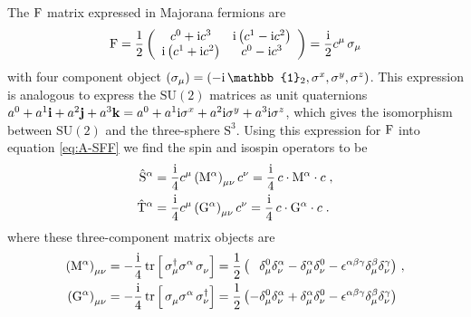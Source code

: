 The $\mathrm{F}$ matrix expressed in Majorana fermions are
\begin{equation}
    \mathrm{F} = \frac{1}{2} \left( \begin{array}{cc}
          c^0 + \mathrm{i} c^3 & \mathrm{i} \left( c^1 - \mathrm{i} c^2 \right)  \\
         \mathrm{i} \left( c^1 + \mathrm{i} c^2 \right) &  c^0 - \mathrm{i} c^3  \\
    \end{array} \right)
    = \frac{\mathrm{i} }{2}  c^\mu \,  \sigma_\mu
\end{equation}
with four component object $(\sigma_\mu)=(-\im \, \mathbb{1}_2,\sigma^x,\sigma^y,\sigma^z)$. %
This expression is analogous to express the $\mathrm{SU}(2)$ matrices as unit quaternions $ a^0 +  a^1 \mathbf{i} +  a^2 \mathbf{j}+  a^3 \mathbf{k} = a^0 +  a^1 \mathrm{i} \sigma^x+  a^2 \mathrm{i} \sigma^y+  a^3 \mathrm{i}  \sigma^z$, which gives the isomorphism between $\mathrm{SU}(2)$ and the three-sphere $\mathrm{S}^3$.
Using this expression for $\mathrm{F}$ into equation \eqref{eq:A-SFF}  we find the spin and isospin operators to be
\begin{equation}
\begin{split}
     \hat{\mathrm{S}}^\alpha
     &= \frac{\mathrm{i}}{4}  c^\mu  \left( \mathrm{M}^\alpha \right)_{\mu\nu}  c^\nu
     =  \frac{\mathrm{i}}{4}  \, c \cdot \mathrm{M}^\alpha \cdot  c
     \; , \\
     \hat{\mathrm{T}}^\alpha
     &= \frac{\mathrm{i}}{4}  c^\mu  \left( \mathrm{G}^\alpha \right)_{\mu\nu}  c^\nu
     =  \frac{\mathrm{i}}{4}  \, c \cdot \mathrm{G}^\alpha \cdot  c\; .
\end{split}
\end{equation}
where these three-component matrix objects are
\begin{align}
    \left( \rmM^\alpha \right)_{\mu\nu} &= -\frac{\im}{4} \,  \tr \, \Big[  \, \sigma_\mu^\dagger \sigma^\alpha \, \sigma_\nu^\pd  \Big]
    = \frac{1}{2} \left( \phantom{-}  \delta^0_\mu \delta^\alpha_\nu - \delta^\alpha_\mu \delta^0_\nu
    - \epsilon^{\alpha\beta\gamma}  \delta^\beta_\mu \delta^\gamma_\nu
    \right)
    \, , \label{A:MG} \\
    \left( \rmG^\alpha \right)_{\mu\nu} &=- \frac{\im}{4} \,  \tr \, \Big[  \, \sigma_\mu^\pd \sigma^\alpha \, \sigma_\nu^\dagger  \Big]
    =  \frac{1}{2} \left( -\delta^0_\mu \delta^\alpha_\nu + \delta^\alpha_\mu \delta^0_\nu
    - \epsilon^{\alpha\beta\gamma}  \delta^\beta_\mu \delta^\gamma_\nu
    \right)
\end{align}
